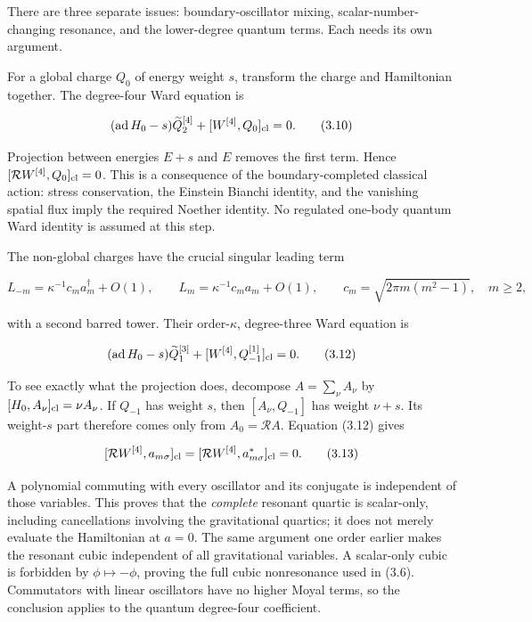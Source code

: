 \documentclass[a4paper,11pt]{article}
\numberwithin{equation}{section}
\begin{document}
There are three separate issues: boundary-oscillator mixing, scalar-number-changing resonance, and the lower-degree quantum terms. Each needs its own argument.

For a global charge \(Q_0\) of energy weight \(s\), transform the charge and Hamiltonian together. The degree-four Ward equation is

\[
(\operatorname{ad}H_0-s)\widetilde Q_2^{[4]}
+[W^{[4]},Q_0]_{\rm cl}=0 .
\tag{3.10}
\]

Projection between energies \(E+s\) and \(E\) removes the first term. Hence \([\mathcal RW^{[4]},Q_0]_{\rm cl}=0\). This is a consequence of the boundary-completed classical action: stress conservation, the Einstein Bianchi identity, and the vanishing spatial flux imply the required Noether identity. No regulated one-body quantum Ward identity is assumed at this step.

The non-global charges have the crucial singular leading term

\[
L_{-m}=\kappa^{-1}c_m a_m^\dagger+O(1),\qquad
L_m=\kappa^{-1}c_m a_m+O(1),\qquad
c_m=\sqrt{2\pi m(m^2-1)},\quad m\ge2 ,
\tag{3.11}
\]

with a second barred tower. Their order-\(\kappa\), degree-three Ward equation is

\[
(\operatorname{ad}H_0-s)\widetilde Q_1^{[3]}
+[W^{[4]},Q_{-1}^{[1]}]_{\rm cl}=0 .
\tag{3.12}
\]

To see exactly what the projection does, decompose \(A=\sum_\nu A_\nu\) by \([H_0,A_\nu]_{\rm cl}=\nu A_\nu\). If \(Q_{-1}\) has weight \(s\), then \([A_\nu,Q_{-1}]\) has weight \(\nu+s\). Its weight-\(s\) part therefore comes only from \(A_0=\mathcal RA\). Equation (3.12) gives

\[
[\mathcal RW^{[4]},a_{m\sigma}]_{\rm cl}
=[\mathcal RW^{[4]},a^*_{m\sigma}]_{\rm cl}=0 .
\tag{3.13}
\]

A polynomial commuting with every oscillator and its conjugate is independent of those variables. This proves that the \emph{complete} resonant quartic is scalar-only, including cancellations involving the gravitational quartics; it does not merely evaluate the Hamiltonian at \(a=0\). The same argument one order earlier makes the resonant cubic independent of all gravitational variables. A scalar-only cubic is forbidden by \(\phi\mapsto-\phi\), proving the full cubic nonresonance used in (3.6). Commutators with linear oscillators have no higher Moyal terms, so the conclusion applies to the quantum degree-four coefficient.
\end{document}
